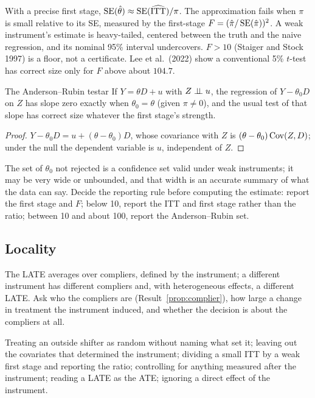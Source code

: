 \documentclass[11pt]{article}
\begin{document}
With a precise first stage, $\operatorname{SE}(\hat\theta) \approx \operatorname{SE}(\widehat{\text{ITT}})/\pi$. The approximation fails when $\pi$ is small relative to its
SE, measured by the first-stage $F = (\hat\pi/\operatorname{SE}(\hat\pi))^2$. A weak instrument's estimate is heavy-tailed, centered between the truth
and the naive regression, and its nominal 95\% interval undercovers. $F > 10$ (Staiger and Stock 1997) is a floor, not a certificate. Lee
et al.\ (2022) show a conventional 5\% $t$-test has correct size only for $F$ above about $104.7$.

\begin{prop}{The Anderson--Rubin test}{ar}
If $Y = \theta D + u$ with $Z \perp\!\!\!\perp u$, the regression of $Y - \theta_0D$ on $Z$ has slope zero exactly when $\theta_0 = \theta$ (given $\pi \ne 0$),
and the usual test of that slope has correct size whatever the first stage's strength.
\end{prop}
\begin{proof}
$Y - \theta_0D = u + (\theta - \theta_0)D$, whose covariance with $Z$ is $(\theta - \theta_0)\operatorname{Cov}(Z, D)$; under the null the dependent variable is
$u$, independent of $Z$.
\end{proof}

The set of $\theta_0$ not rejected is a confidence set valid under weak instruments; it may be very wide or unbounded, and that
width is an accurate summary of what the data can say. Decide the reporting rule before computing the estimate: report the first stage and $F$; below 10, report the ITT and first stage
rather than the ratio; between 10 and about 100, report the Anderson--Rubin set.

\subsection{Locality}

The LATE averages over compliers, defined by the instrument; a different instrument has different compliers and, with heterogeneous
effects, a different LATE. Ask who the compliers are (Result~\ref{prop:complier}), how large a change in treatment the instrument
induced, and whether the decision is about the compliers at all.

\begin{pitfall}[IV errors]
Treating an outside shifter as random without naming what set it; leaving out the covariates that determined the instrument;
dividing a small ITT by a weak first stage and reporting the ratio; controlling for anything measured after the instrument; reading a
LATE as the ATE; ignoring a direct effect of the instrument.
\end{pitfall}
\end{document}

